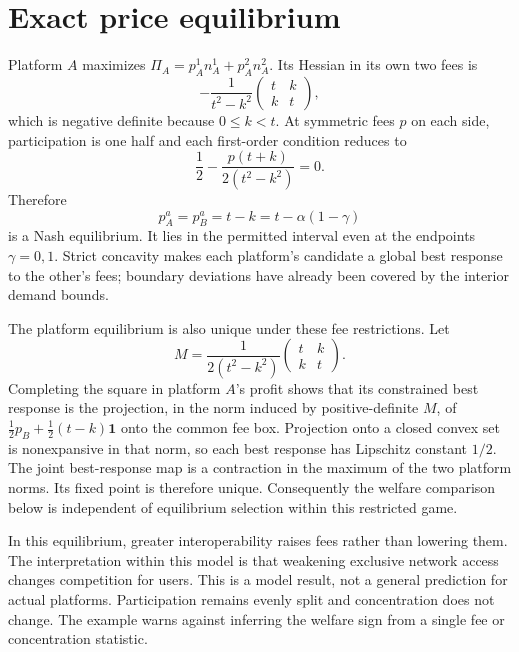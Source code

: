 \documentclass[11pt]{article}
\begin{document}
\section*{Exact price equilibrium}
Platform $A$ maximizes $\Pi_A=p_A^1n_A^1+p_A^2n_A^2$. Its Hessian in its own two fees is
\[
 -\frac{1}{t^2-k^2}\begin{pmatrix}t&k\\k&t\end{pmatrix},
\]
which is negative definite because $0\leq k<t$. At symmetric fees $p$ on each side, participation is one half and each first-order condition reduces to
\[
 \frac12-\frac{p(t+k)}{2(t^2-k^2)}=0.
\]
Therefore
\[
                     p_A^a=p_B^a=t-k=t-\alpha(1-\gamma)
\]
is a Nash equilibrium. It lies in the permitted interval even at the endpoints $\gamma=0,1$. Strict concavity makes each platform's candidate a global best response to the other's fees; boundary deviations have already been covered by the interior demand bounds.

The platform equilibrium is also unique under these fee restrictions. Let
\[
 M=\frac{1}{2(t^2-k^2)}\begin{pmatrix}t&k\\k&t\end{pmatrix}.
\]
Completing the square in platform $A$'s profit shows that its constrained best response is the projection, in the norm induced by positive-definite $M$, of
$\tfrac12p_B+\tfrac12(t-k)\mathbf1$ onto the common fee box. Projection onto a closed convex set is nonexpansive in that norm, so each best response has Lipschitz constant $1/2$. The joint best-response map is a contraction in the maximum of the two platform norms. Its fixed point is therefore unique. Consequently the welfare comparison below is independent of equilibrium selection within this restricted game.

In this equilibrium, greater interoperability raises fees rather than lowering them. The interpretation within this model is that weakening exclusive network access changes competition for users. This is a model result, not a general prediction for actual platforms. Participation remains evenly split and concentration does not change. The example warns against inferring the welfare sign from a single fee or concentration statistic.
\end{document}
